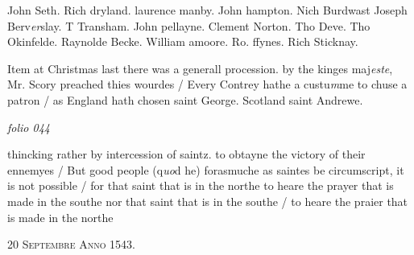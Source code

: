 \documentclass[12pt, a4paper]{book}
\begin{document}
	
		
		\ifthenelse{\isodd{\thepage}}
		{\reversemarginpar}
		{\normalmarginpar}
		
			John Seth. Rich dryland. laurence manby. John hampton. Nich Burdwast
				Joseph Berv\textit{er}slay. T Transham. John pellayne. Clement Norton.
				Tho Deve. Tho Okinfelde. Raynolde Becke. William amoore. Ro. ffynes. Rich
					Sticknay.
			
		
	
	
		
		\ifthenelse{\isodd{\thepage}}
		{\reversemarginpar}
		{\normalmarginpar}
		Item at Christmas last there was a generall
			procession. by the kinges maj\textit{este}, Mr. Scory preached
			thies wourdes / Every Contrey hathe a custu\textit{m}me
			to chuse a patron / as England hath chosen 
			saint George. Scotland saint Andrewe.
			
	



\dotfill
					

\textit{folio 044}


	
		
				\marginpar[\vspace{0.5cm}{\textcolor{Gray}{seditious}}]{}
			
		
		\ifthenelse{\isodd{\thepage}}
		{\reversemarginpar}
		{\normalmarginpar}
		
			thincking rather by intercession of saintz. to
				obtayne the victory of their ennemyes / But
				good people (q\textit{uo}d he) forasmuche as saintes be
				circumscript, it is not possible / for that saint that is in the
				northe to heare the prayer that is made in the southe nor that saint
				that is in the southe / to heare the praier that is made in the
				northe
			
		
	
 

            
            
               
				\begin{center} \begin{large} {\scshape 
                  20 Septembre Anno 1543.} \end{large} \end{center}
			
\end{document}

